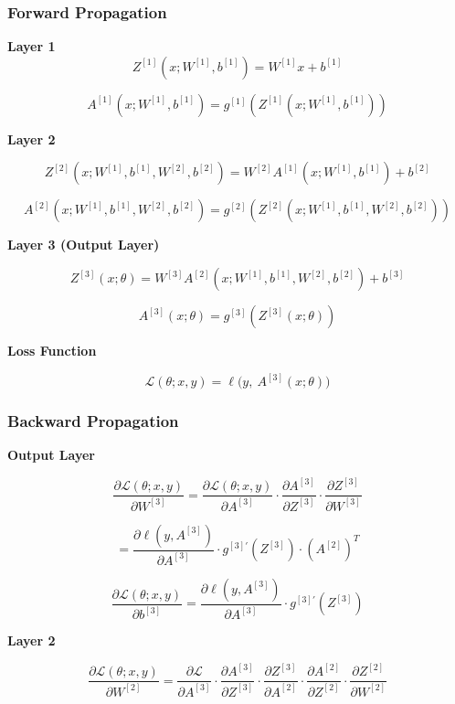 \documentclass[12pt]{report}
\begin{document}
\subsubsection{Forward Propagation}

\textbf{Layer 1}
\[
Z^{[1]}(x; W^{[1]}, b^{[1]}) = W^{[1]}x + b^{[1]}
\]

\[
A^{[1]}(x; W^{[1]}, b^{[1]}) =
g^{[1]}(Z^{[1]}(x; W^{[1]}, b^{[1]}))
\]



\textbf{Layer 2}

\[
Z^{[2]}(x; W^{[1]}, b^{[1]}, W^{[2]}, b^{[2]}) =
W^{[2]}A^{[1]}(x; W^{[1]}, b^{[1]}) + b^{[2]}
\]

\[
A^{[2]}(x; W^{[1]}, b^{[1]}, W^{[2]}, b^{[2]}) =
g^{[2]}(Z^{[2]}(x; W^{[1]}, b^{[1]}, W^{[2]}, b^{[2]}))
\]



\textbf{Layer 3 (Output Layer)}

\[
Z^{[3]}(x; \theta) =
W^{[3]}A^{[2]}(x; W^{[1]}, b^{[1]}, W^{[2]}, b^{[2]}) + b^{[3]}
\]

\[
A^{[3]}(x; \theta) =
g^{[3]}(Z^{[3]}(x; \theta))
\]

\textbf{Loss Function}

\[
\mathcal{L}(\theta; x,y) =
\ell\big(y,\ A^{[3]}(x; \theta)\big)
\]

\subsubsection{Backward Propagation}

\textbf{Output Layer}

\[
\frac{\partial \mathcal{L}(\theta; x,y)}{\partial W^{[3]}}
=
\frac{\partial \mathcal{L}(\theta; x,y)}{\partial A^{[3]}}
\cdot
\frac{\partial A^{[3]}}{\partial Z^{[3]}}
\cdot
\frac{\partial Z^{[3]}}{\partial W^{[3]}}
\]

\[
=
\frac{\partial \ell(y, A^{[3]})}{\partial A^{[3]}}
\cdot
g^{[3]'}(Z^{[3]})
\cdot
(A^{[2]})^T
\]

\[
\frac{\partial \mathcal{L}(\theta; x,y)}{\partial b^{[3]}}
=
\frac{\partial \ell(y, A^{[3]})}{\partial A^{[3]}}
\cdot
g^{[3]'}(Z^{[3]})
\]

\textbf{Layer 2}

\[
\frac{\partial \mathcal{L}(\theta; x,y)}{\partial W^{[2]}}
=
\frac{\partial \mathcal{L}}{\partial A^{[3]}}
\cdot
\frac{\partial A^{[3]}}{\partial Z^{[3]}}
\cdot
\frac{\partial Z^{[3]}}{\partial A^{[2]}}
\cdot
\frac{\partial A^{[2]}}{\partial Z^{[2]}}
\cdot
\frac{\partial Z^{[2]}}{\partial W^{[2]}}
\]
\end{document}
